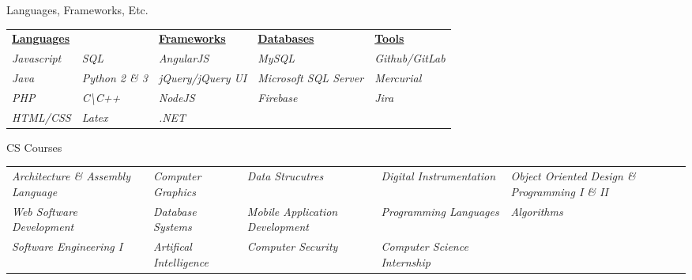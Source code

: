 \documentclass{resume} %
\begin{document}
\begin{rSection}{Languages, Frameworks, Etc.}

    \begin{table}[h]
        \begin{tabular}{lllll}
        \multicolumn{2}{l}{{\ul \textbf{Languages}}} & {\ul \textbf{Frameworks}} & {\ul \textbf{Databases}} & {\ul \textbf{Tools}} \\
        \textit{Javascript} & \textit{SQL} & \textit{AngularJS} & \textit{MySQL} & \textit{Github/GitLab} \\
        \textit{Java} & \textit{Python 2 \& 3} & \textit{jQuery/jQuery UI} & \textit{Microsoft SQL Server} & \textit{Mercurial} \\
        \textit{PHP} & \textit{C\textbackslash{}C++} & \textit{NodeJS} & \textit{Firebase} & \textit{Jira} \\
        \textit{HTML/CSS} & \textit{Latex} & \textit{.NET} & \textit{} & \textit{}
        \end{tabular}
    \end{table}

\end{rSection}


\begin{rSection}{CS Courses}

    \begin{table}[h]
        \begin{tabular}{lllll}
        \textit{Architecture \& Assembly Language} & \textit{Computer Graphics} & \textit{Data Strucutres} & \textit{Digital Instrumentation} & \textit{Object Oriented Design \& Programming I \& II} \\
        \textit{Web Software Development} & \textit{Database Systems} & \textit{Mobile Application Development} & \textit{Programming Languages} & \textit{Algorithms} \\
        \textit{Software Engineering I} & \textit{Artifical Intelligence} & \textit{Computer Security} & \textit{Computer Science Internship} & \textit{}
        \end{tabular}
    \end{table}

\end{rSection}
\end{document}
